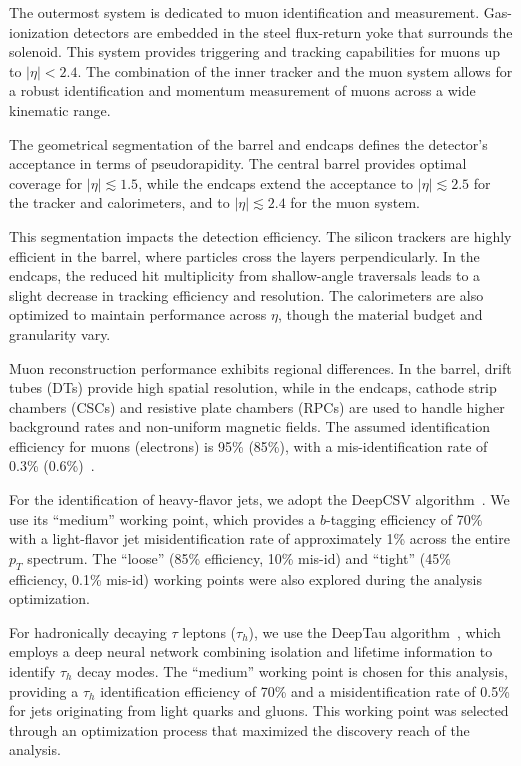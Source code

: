 The outermost system is dedicated to muon identification and measurement. Gas-ionization detectors are embedded in the steel flux-return yoke that surrounds the solenoid. This system provides triggering and tracking capabilities for muons up to $|\eta| < 2.4$. The combination of the inner tracker and the muon system allows for a robust identification and momentum measurement of muons across a wide kinematic range.

The geometrical segmentation of the barrel and endcaps defines the detector's acceptance in terms of pseudorapidity. The central barrel provides optimal coverage for $|\eta| \lesssim 1.5$, while the endcaps extend the acceptance to $|\eta| \lesssim 2.5$ for the tracker and calorimeters, and to $|\eta| \lesssim 2.4$ for the muon system.

This segmentation impacts the detection efficiency. The silicon trackers are highly efficient in the barrel, where particles cross the layers perpendicularly. In the endcaps, the reduced hit multiplicity from shallow-angle traversals leads to a slight decrease in tracking efficiency and resolution. The calorimeters are also optimized to maintain performance across $\eta$, though the material budget and granularity vary.

Muon reconstruction performance exhibits regional differences. In the barrel, drift tubes (DTs) provide high spatial resolution, while in the endcaps, cathode strip chambers (CSCs) and resistive plate chambers (RPCs) are used to handle higher background rates and non-uniform magnetic fields. The assumed identification efficiency for muons (electrons) is 95\% (85\%), with a mis-identification rate of 0.3\% (0.6\%)~\parencite{CMS-PAS-FTR-13-014,CMS_MUON_17001,CMS_EGM_17001}.

For the identification of heavy-flavor jets, we adopt the DeepCSV algorithm~\parencite{CMS_BTV2016}. We use its ``medium'' working point, which provides a $b$-tagging efficiency of 70\% with a light-flavor jet misidentification rate of approximately 1\% across the entire $p_T$ spectrum. The ``loose'' (85\% efficiency, 10\% mis-id) and ``tight'' (45\% efficiency, 0.1\% mis-id) working points were also explored during the analysis optimization.

For hadronically decaying $\tau$ leptons ($\tau_h$), we use the DeepTau algorithm~\parencite{CMS_DeepTau}, which employs a deep neural network combining isolation and lifetime information to identify $\tau_h$ decay modes. The ``medium'' working point is chosen for this analysis, providing a $\tau_h$ identification efficiency of 70\% and a misidentification rate of 0.5\% for jets originating from light quarks and gluons. This working point was selected through an optimization process that maximized the discovery reach of the analysis.
